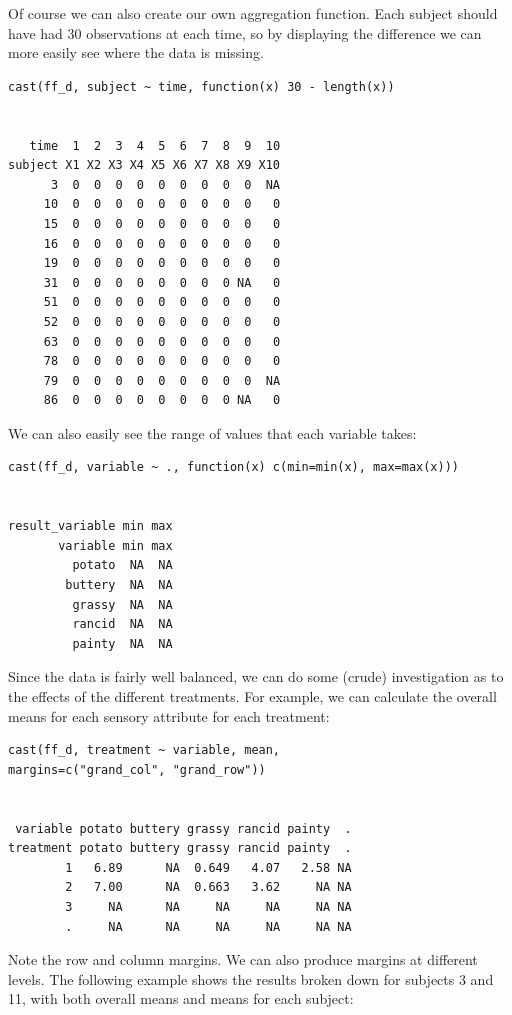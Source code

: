 \documentclass[]{article}
\begin{document}
Of course we can also create our own aggregation function.  Each subject should have had 30 observations at each time, so by displaying the difference we can more easily see where the data is missing.

\begin{verbatim}
cast(ff_d, subject ~ time, function(x) 30 - length(x))

                                      
   time  1  2  3  4  5  6  7  8  9  10
subject X1 X2 X3 X4 X5 X6 X7 X8 X9 X10
      3  0  0  0  0  0  0  0  0  0  NA
     10  0  0  0  0  0  0  0  0  0   0
     15  0  0  0  0  0  0  0  0  0   0
     16  0  0  0  0  0  0  0  0  0   0
     19  0  0  0  0  0  0  0  0  0   0
     31  0  0  0  0  0  0  0  0 NA   0
     51  0  0  0  0  0  0  0  0  0   0
     52  0  0  0  0  0  0  0  0  0   0
     63  0  0  0  0  0  0  0  0  0   0
     78  0  0  0  0  0  0  0  0  0   0
     79  0  0  0  0  0  0  0  0  0  NA
     86  0  0  0  0  0  0  0  0 NA   0
\end{verbatim}

We can also easily see the range of values that each variable takes:

\begin{verbatim}
cast(ff_d, variable ~ ., function(x) c(min=min(x), max=max(x)))

                       
result_variable min max
       variable min max
         potato  NA  NA
        buttery  NA  NA
         grassy  NA  NA
         rancid  NA  NA
         painty  NA  NA
\end{verbatim}

Since the data is fairly well balanced, we can do some (crude) investigation as to the effects of the different treatments.  For example, we can calculate the overall means for each sensory attribute for each treatment:

\begin{verbatim}
cast(ff_d, treatment ~ variable, mean, 
margins=c("grand_col", "grand_row"))

                                                
 variable potato buttery grassy rancid painty  .
treatment potato buttery grassy rancid painty  .
        1   6.89      NA  0.649   4.07   2.58 NA
        2   7.00      NA  0.663   3.62     NA NA
        3     NA      NA     NA     NA     NA NA
        .     NA      NA     NA     NA     NA NA
\end{verbatim}

Note the row and column margins.  We can also produce margins at different levels.  The following example shows the results broken down for subjects 3 and 11, with both overall means and means for each subject:
\end{document}
